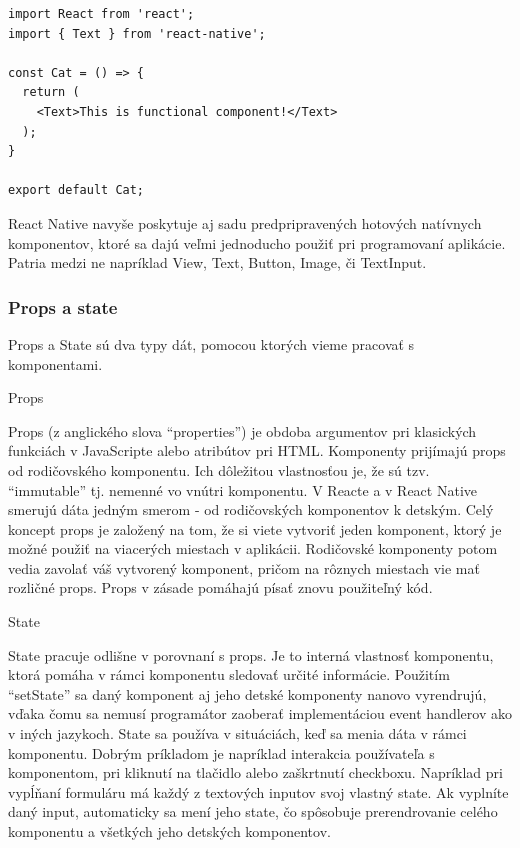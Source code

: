 \begin{itemize}[leftmargin=*]
\begin{lstlisting}[caption={Príklad function komponentu}, label={funcComponent}]
import React from 'react';
import { Text } from 'react-native';

const Cat = () => {
  return (
    <Text>This is functional component!</Text>
  );
}

export default Cat;
\end{lstlisting}

\end{itemize}

React Native navyše poskytuje aj sadu predpripravených hotových natívnych komponentov, ktoré sa dajú veľmi jednoducho použiť pri programovaní aplikácie. Patria medzi ne napríklad View, Text, Button, Image, či TextInput. \\

\subsubsection{Props a state}
Props a State sú dva typy dát, pomocou ktorých vieme pracovať s komponentami.
\begin{itemize}[leftmargin=*]
{\bf \item Props} \newline
Props (z anglického slova ``properties'') je obdoba argumentov pri klasických funkciách v JavaScripte alebo atribútov pri HTML. Komponenty prijímajú props od rodičovského komponentu. Ich dôležitou vlastnosťou je, že sú tzv. ``immutable'' tj. nemenné vo vnútri komponentu. V Reacte a v React Native smerujú dáta jedným smerom - od rodičovských komponentov k detským. Celý koncept props je založený na tom, že si viete vytvoriť jeden komponent, ktorý je možné použiť na viacerých miestach v aplikácii. Rodičovské komponenty potom vedia zavolať váš vytvorený komponent, pričom na rôznych miestach vie mať rozličné props. Props v zásade pomáhajú písať znovu použiteľný kód.
{\bf \item State} \newline
State pracuje odlišne v porovnaní s props. Je to interná vlastnosť komponentu, ktorá pomáha v rámci komponentu sledovať určité informácie. Použitím ``setState'' sa daný komponent aj jeho detské komponenty nanovo vyrendrujú, vďaka čomu sa nemusí programátor zaoberať implementáciou event handlerov ako v iných jazykoch. State sa používa v situáciách, keď sa menia dáta v rámci komponentu. Dobrým príkladom je napríklad interakcia používateľa s komponentom, pri kliknutí na tlačidlo alebo zaškrtnutí checkboxu. Napríklad pri vypĺňaní formuláru má každý z textových inputov svoj vlastný state. Ak vyplníte daný input, automaticky sa mení jeho state, čo spôsobuje prerendrovanie celého komponentu a všetkých jeho detských komponentov. \\
\end{itemize} 
